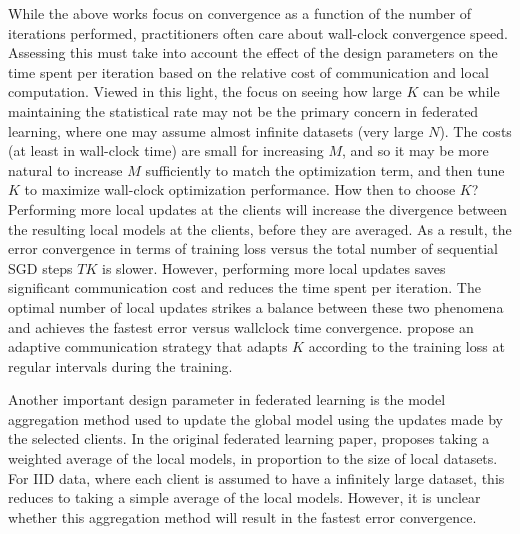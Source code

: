 \documentclass[11pt]{article}
\begin{document}
While the above works focus on convergence as a function of the number of iterations performed, practitioners often care about wall-clock convergence speed. Assessing this must take into account the effect of the design parameters on the time spent per iteration based on the relative cost of communication and local computation. Viewed in this light, the focus on seeing how large $K$ can be while maintaining the statistical rate may not be the primary concern in federated learning, where one may assume almost infinite datasets (very large $N$). The costs (at least in wall-clock time) are small for increasing $M$, and so it may be more natural to increase $M$ sufficiently to match the optimization term, and then tune $K$ to maximize wall-clock optimization performance. 
How then to choose $K$? Performing more local updates at the clients will increase the divergence between the resulting local models at the clients, before they are averaged. As a result, the error convergence in terms of training loss versus the total number of sequential SGD steps $TK$ is slower. However, performing more local updates saves significant communication cost and reduces the time spent per iteration. The optimal number of local updates strikes a balance between these two phenomena and achieves the fastest error versus wallclock time convergence. \citet{wang2018adaptive} propose an adaptive communication strategy that adapts $K$ according to the training loss at regular intervals during the training.

Another important design parameter in federated learning is the model aggregation method used to update the global model using the updates made by the selected clients. In the original federated learning paper, \citet{mcmahan17fedavg} proposes taking a weighted average of the local models, in proportion to the size of local datasets. For IID data, where each client is assumed to have a infinitely large dataset, this reduces to taking a simple average of the local models. However, it is unclear whether this aggregation method will result in the fastest error convergence. 

\end{document}
